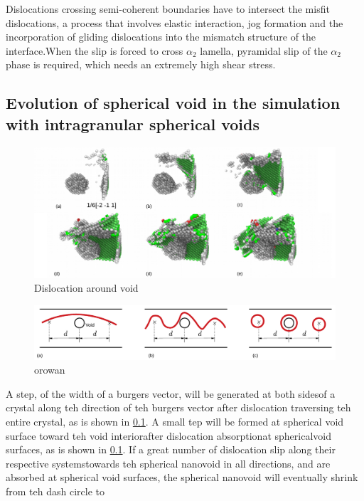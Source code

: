\documentclass[journal,article,submit,moreauthors,pdftex,10pt,a4paper]{Definitions/mdpi}
\begin{document}
Dislocations crossing semi-coherent boundaries have to intersect the misfit dislocations, a process that involves elastic interaction, jog formation and the incorporation of gliding dislocations into the mismatch structure of the interface.When the slip is forced to cross $\alpha_2$ lamella, pyramidal slip of the $\alpha_2$ phase is required, which needs an extremely high shear stress.
	
	
	
	
\subsection{Evolution of spherical void in the simulation with intragranular spherical voids}
\begin{figure}[ht]
	\centering
	\includegraphics[width=1\linewidth]{"img/dis-void"}
	\caption{Dislocation around void}
	\label{fig:dis-void}
\end{figure}

\begin{figure}[ht]
	\centering
	\includegraphics[width=1\linewidth]{"img/orowan"}
	\caption{orowan}
	\label{fig:dis-void}
\end{figure}

A step, of the width of a burgers vector, will be generated at both sidesof a crystal along teh direction of teh burgers vector after dislocation traversing teh entire crystal, as is shown in \ref{}. A small tep will be formed at spherical void surface toward teh void interiorafter dislocation absorptionat sphericalvoid surfaces, as is shown in \ref{}. If a great number of dislocation slip along their respective systemstowards teh spherical nanovoid in all directions, and are absorbed at spherical void surfaces, the spherical nanovoid will eventually shrink from teh dash circle to
	
\end{document}
